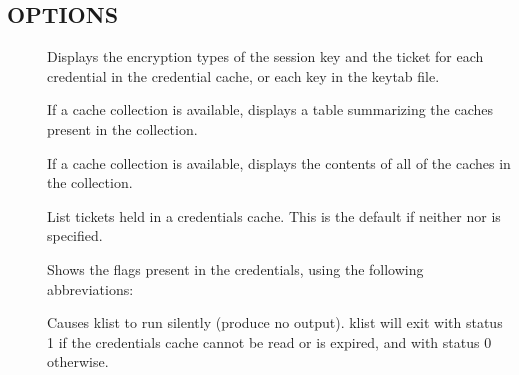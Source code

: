 \documentclass[letterpaper,10pt,english]{sphinxmanual}
\begin{document}
\subsection{OPTIONS}
\label{\detokenize{user/user_commands/klist:options}}\begin{description}
\item[{}] \leavevmode
\sphinxAtStartPar
Displays the encryption types of the session key and the ticket
for each credential in the credential cache, or each key in the
keytab file.

\item[{}] \leavevmode
\sphinxAtStartPar
If a cache collection is available, displays a table summarizing
the caches present in the collection.

\item[{}] \leavevmode
\sphinxAtStartPar
If a cache collection is available, displays the contents of all
of the caches in the collection.

\item[{}] \leavevmode
\sphinxAtStartPar
List tickets held in a credentials cache. This is the default if
neither  nor  is specified.

\item[{}] \leavevmode
\sphinxAtStartPar
Shows the flags present in the credentials, using the following
abbreviations:

\begin{sphinxVerbatim}[commandchars=\\\{\}]
    
    
    
    
    
    
    
    
    
     
    
      
      
    
\end{sphinxVerbatim}

\item[{}] \leavevmode
\sphinxAtStartPar
Causes klist to run silently (produce no output).  klist will exit
with status 1 if the credentials cache cannot be read or is
expired, and with status 0 otherwise.


\end{description}
\end{document}
